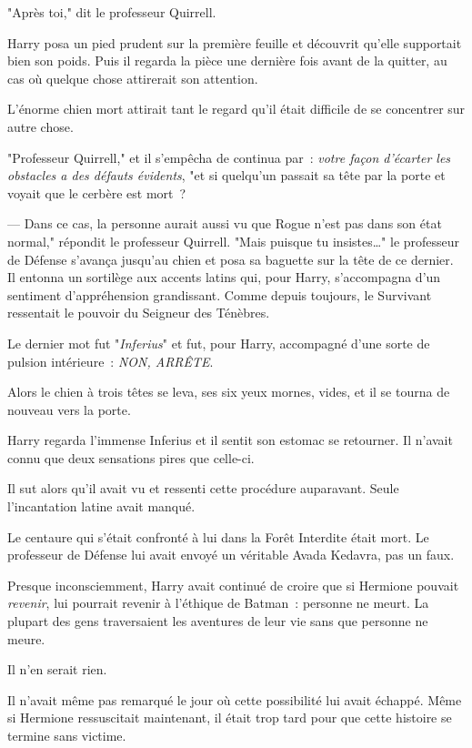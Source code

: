 "Après toi," dit le professeur Quirrell.

Harry posa un pied prudent sur la première feuille et découvrit qu'elle supportait bien son poids. Puis il regarda la pièce une dernière fois avant de la quitter, au cas où quelque chose attirerait son attention.

L'énorme chien mort attirait tant le regard qu'il était difficile de se concentrer sur autre chose.

"Professeur Quirrell," et il s'empêcha de continua par~: \emph{votre façon d'écarter les obstacles a des défauts évidents}, "et si quelqu'un passait sa tête par la porte et voyait que le cerbère est mort~?

--- Dans ce cas, la personne aurait aussi vu que Rogue n'est pas dans son état normal," répondit le professeur Quirrell. "Mais puisque tu insistes…" le professeur de Défense s'avança jusqu'au chien et posa sa baguette sur la tête de ce dernier. Il entonna un sortilège aux accents latins qui, pour Harry, s'accompagna d'un sentiment d'appréhension grandissant. Comme depuis toujours, le Survivant ressentait le pouvoir du Seigneur des Ténèbres.

Le dernier mot fut "\emph{Inferius}" et fut, pour Harry, accompagné d'une sorte de pulsion intérieure~: \emph{NON, ARRÊTE}.

Alors le chien à trois têtes se leva, ses six yeux mornes, vides, et il se tourna de nouveau vers la porte.

Harry regarda l'immense Inferius et il sentit son estomac se retourner. Il n'avait connu que deux sensations pires que celle-ci.

Il sut alors qu'il avait vu et ressenti cette procédure auparavant. Seule l'incantation latine avait manqué.

Le centaure qui s'était confronté à lui dans la Forêt Interdite était mort. Le professeur de Défense lui avait envoyé un véritable Avada Kedavra, pas un faux.

Presque inconsciemment, Harry avait continué de croire que si Hermione pouvait \emph{revenir}, lui pourrait revenir à l'éthique de Batman~: personne ne meurt. La plupart des gens traversaient les aventures de leur vie sans que personne ne meure.

Il n'en serait rien.

Il n'avait même pas remarqué le jour où cette possibilité lui avait échappé. Même si Hermione ressuscitait maintenant, il était trop tard pour que cette histoire se termine sans victime.

